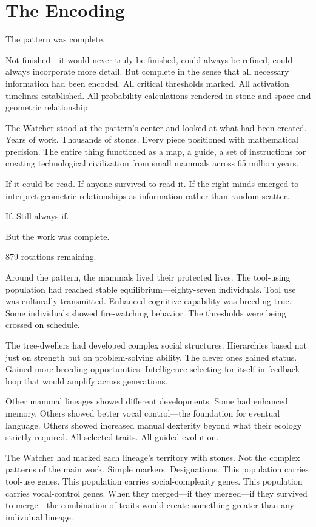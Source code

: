 \chapter{The Encoding}
\label{ch:09}


The pattern was complete.

Not finished—it would never truly be finished, could always be refined, could always incorporate more detail. But complete in the sense that all necessary information had been encoded. All critical thresholds marked. All activation timelines established. All probability calculations rendered in stone and space and geometric relationship.

The Watcher stood at the pattern's center and looked at what had been created. Years of work. Thousands of stones. Every piece positioned with mathematical precision. The entire thing functioned as a map, a guide, a set of instructions for creating technological civilization from small mammals across 65 million years.

If it could be read. If anyone survived to read it. If the right minds emerged to interpret geometric relationships as information rather than random scatter.

If. Still always if.

But the work was complete.

879 rotations remaining.

\scenebreak

Around the pattern, the mammals lived their protected lives. The tool-using population had reached stable equilibrium—eighty-seven individuals. Tool use was culturally transmitted. Enhanced cognitive capability was breeding true. Some individuals showed fire-watching behavior. The thresholds were being crossed on schedule.

The tree-dwellers had developed complex social structures. Hierarchies based not just on strength but on problem-solving ability. The clever ones gained status. Gained more breeding opportunities. Intelligence selecting for itself in feedback loop that would amplify across generations.

Other mammal lineages showed different developments. Some had enhanced memory. Others showed better vocal control—the foundation for eventual language. Others showed increased manual dexterity beyond what their ecology strictly required. All selected traits. All guided evolution.

The Watcher had marked each lineage's territory with stones. Not the complex patterns of the main work. Simple markers. Designations. This population carries tool-use genes. This population carries social-complexity genes. This population carries vocal-control genes. When they merged—if they merged—if they survived to merge—the combination of traits would create something greater than any individual lineage.


